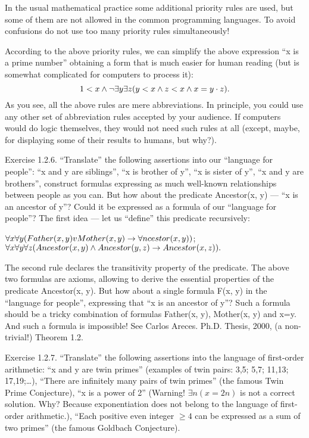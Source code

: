 In the usual mathematical practice some additional priority rules are used, but some of them are not allowed in the common programming languages. To avoid confusions do not use too many priority rules simultaneously!

According to the above priority rules, we can simplify the above expression ``x is a prime number'' obtaining a form that is much easier for human reading (but is somewhat complicated for computers to process it):
\[
1<x \wedge  \neg \exists y\exists z(y<x \wedge  z<x \wedge  x=y\cdot z).
\]
As you see, all the above rules are mere abbreviations. In principle, you could use any other set of abbreviation rules accepted by your audience. If computers would do logic themselves, they would not need such rules at all (except, maybe, for displaying some of their results to humans, but why?).

Exercise 1.2.6. ``Translate'' the following assertions into our ``language for people'':
``x and y are siblings'',
``x is brother of y'', ``x is sister of y'',
``x and y are brothers'',
construct formulas expressing as much well-known relationships between people as you can.
But how about the predicate Ancestor(x, y) --- ``x is an ancestor of y''? Could it be expressed as a formula
of our ``language for people''? The first idea --- let us ``define'' this predicate recursively:

\(\forall x\forall y(Father(x, y) v Mother(x, y)\rightarrow \forall ncestor(x, y))\);
\(\forall x\forall y\forall z(Ancestor(x, y) \wedge  Ancestor(y, z)\rightarrow Ancestor(x, z)).\)

The second rule declares the transitivity property of the predicate. The above two formulas are axioms, allowing to derive the essential properties of the predicate Ancestor(x, y). But how about a single formula F(x, y) in the ``language for people'', expressing that ``x is an ancestor of y''? Such a formula should be a tricky combination of formulas Father(x, y), Mother(x, y) and x=y. And such a formula is impossible! See Carlos Areces. Ph.D. Thesis, 2000, (a non-trivial!) Theorem 1.2.

Exercise 1.2.7. ``Translate'' the following assertions into the language of first-order arithmetic:
``x and y are twin primes'' (examples of twin pairs: 3,5; 5,7; 11,13; 17,19;\ldots ),
``There are infinitely many pairs of twin primes'' (the famous Twin Prime Conjecture),
``x is a power of 2'' (Warning! \(\exists n(x=2n)\) is not a correct solution. Why? Because exponentiation does not
belong to the language of first-order arithmetic.),
``Each positive even integer \(\geq4\) can be expressed as a sum of two primes''
(the famous Goldbach Conjecture).

